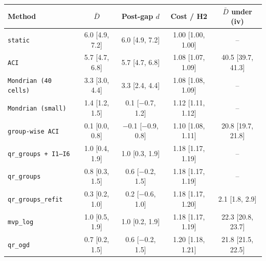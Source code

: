\begin{tabular}{@{}lcccc@{}}
\toprule
Method & $\bar{D}$ & Post-gap $d$ & Cost / H2 & $\bar{D}$ under (iv) \\
\midrule
\texttt{static} & 6.0 [4.9, 7.2] & 6.0 [4.9, 7.2] & 1.00 [1.00, 1.00] & -- \\
\texttt{ACI} & 5.7 [4.7, 6.8] & 5.7 [4.7, 6.8] & 1.08 [1.07, 1.09] & 40.5 [39.7, 41.3] \\
\texttt{Mondrian (40 cells)} & 3.3 [3.0, 4.4] & 3.3 [2.4, 4.4] & 1.08 [1.08, 1.09] & -- \\
\texttt{Mondrian (small)} & 1.4 [1.2, 1.5] & 0.1 [$-$0.7, 1.2] & 1.12 [1.11, 1.12] & -- \\
\texttt{group-wise ACI} & 0.1 [0.0, 0.8] & $-$0.1 [$-$0.9, 0.8] & 1.10 [1.08, 1.11] & 20.8 [19.7, 21.8] \\
\texttt{qr\_groups + I1--I6} & 1.0 [0.4, 1.9] & 1.0 [0.3, 1.9] & 1.18 [1.17, 1.19] & -- \\
\texttt{qr\_groups} & 0.8 [0.3, 1.5] & 0.6 [$-$0.2, 1.5] & 1.18 [1.17, 1.19] & -- \\
\texttt{qr\_groups\_refit} & 0.3 [0.2, 1.0] & 0.2 [$-$0.6, 1.0] & 1.18 [1.17, 1.20] & 2.1 [1.8, 2.9] \\
\texttt{mvp\_log} & 1.0 [0.5, 1.9] & 1.0 [0.2, 1.9] & 1.18 [1.17, 1.19] & 22.3 [20.8, 23.7] \\
\texttt{qr\_ogd} & 0.7 [0.2, 1.5] & 0.6 [$-$0.2, 1.5] & 1.20 [1.18, 1.21] & 21.8 [21.5, 22.5] \\
\bottomrule
\end{tabular}
